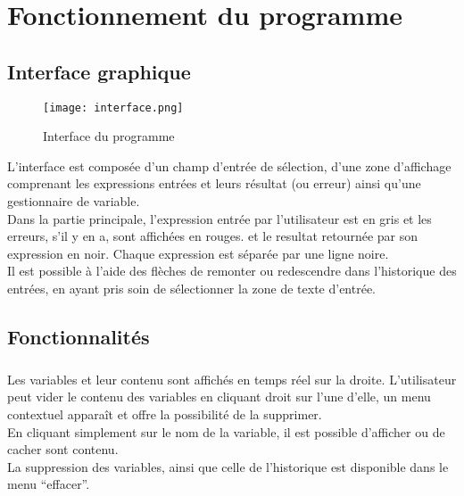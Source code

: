 \chapter{Fonctionnement du programme}
    \section{Interface graphique}
        \begin{figure}[h]
            \begin{center}
                \texttt{[image: interface.png]}
            \end{center}

            \caption{Interface du programme}
            \label{Interface du programme}
        \end{figure}

    L'interface est composée d'un champ d'entrée de sélection, d'une zone d'affichage comprenant les expressions entrées et leurs résultat (ou erreur) ainsi qu'une gestionnaire de variable.
    \\ Dans la partie principale, l'expression entrée par l'utilisateur est en gris et les erreurs, s'il y en a, sont affichées en rouges. et le resultat retournée par son expression en noir. Chaque expression est séparée par une ligne noire.
    \\ Il est possible à l'aide des flèches de remonter ou redescendre dans l'historique des entrées, en ayant pris soin de sélectionner la zone de texte d'entrée.
 

    \newpage

    \section{Fonctionnalités}
        \paragraph{}
            Les variables et leur contenu sont affichés en temps réel sur la droite. L'utilisateur peut vider le contenu des variables en cliquant droit sur l'une d'elle, un menu contextuel apparaît et offre la possibilité de la supprimer.
            \\ En cliquant simplement sur le nom de la variable, il est possible d'afficher ou de cacher sont contenu.
            \\ La suppression des variables, ainsi que celle de l'historique est disponible dans le menu ``effacer''.

